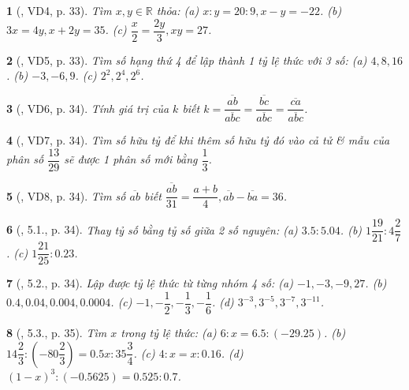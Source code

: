 \documentclass{article}
\newtheorem{baitoan}{}
\begin{document}
\begin{baitoan}[\cite{Binh_boi_duong_Toan_7_tap_1}, VD4, p. 33]
	Tìm $x,y\in\mathbb{R}$ thỏa: (a) $x:y = 20:9,x - y = -22$. (b) $3x = 4y,x + 2y = 35$. (c) $\dfrac{x}{2} = \dfrac{2y}{3},xy = 27$.
\end{baitoan}

\begin{baitoan}[\cite{Binh_boi_duong_Toan_7_tap_1}, VD5, p. 33]
	Tìm số hạng thứ 4 để lập thành 1 tỷ lệ thức với 3 số: (a) $4,8,16$. (b) $-3,-6,9$. (c) $2^2,2^4,2^6$.
\end{baitoan}

\begin{baitoan}[\cite{Binh_boi_duong_Toan_7_tap_1}, VD6, p. 34]
	Tính giá trị của $k$ biết $k = \dfrac{\overline{ab}}{\overline{abc}} = \dfrac{\overline{bc}}{\overline{abc}} = \dfrac{\overline{ca}}{\overline{abc}}$.
\end{baitoan}

\begin{baitoan}[\cite{Binh_boi_duong_Toan_7_tap_1}, VD7, p. 34]
	Tìm số hữu tỷ để khi thêm số hữu tỷ đó vào cả tử \& mẫu của phân số $\dfrac{13}{29}$ sẽ được 1 phân số mới bằng $\dfrac{1}{3}$.
\end{baitoan}

\begin{baitoan}[\cite{Binh_boi_duong_Toan_7_tap_1}, VD8, p. 34]
	Tìm số $\overline{ab}$ biết $\dfrac{\overline{ab}}{31} = \dfrac{a + b}{4},\overline{ab} - \overline{ba} = 36$.
\end{baitoan}

\begin{baitoan}[\cite{Binh_boi_duong_Toan_7_tap_1}, 5.1., p. 34]
	Thay tỷ số bằng tỷ số giữa 2 số nguyên: (a) $3.5:5.04$. (b) $1\dfrac{19}{21}:4\dfrac{2}{7}$. (c) $1\dfrac{21}{25}:0.23$.
\end{baitoan}

\begin{baitoan}[\cite{Binh_boi_duong_Toan_7_tap_1}, 5.2., p. 34]
	Lập được tỷ lệ thức từ từng nhóm 4 số: (a) $-1,-3,-9,27$. (b) $0.4,0.04,0.004,0.0004$. (c) $-1,-\dfrac{1}{2},-\dfrac{1}{3},-\dfrac{1}{6}$. (d) $3^{-3},3^{-5},3^{-7},3^{-11}$.
\end{baitoan}

\begin{baitoan}[\cite{Binh_boi_duong_Toan_7_tap_1}, 5.3., p. 35]
	Tìm $x$ trong tỷ lệ thức: (a) $6:x = 6.5:(-29.25)$. (b) $14\dfrac{2}{3}:\left(-80\dfrac{2}{3}\right) = 0.5x:35\dfrac{3}{4}$. (c) $4:x = x:0.16$. (d) $(1 - x)^3:(-0.5625) = 0.525:0.7$.
\end{baitoan}
\end{document}
